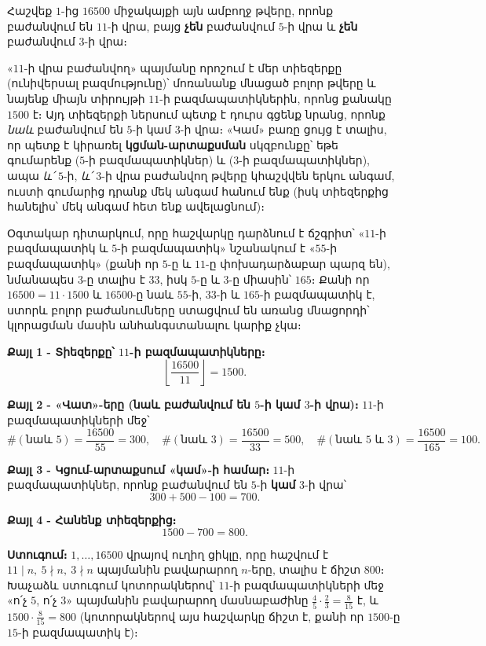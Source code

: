 \documentclass[11pt,a4paper]{article}
\begin{document}
\begin{problembox}[7]
Հաշվեք $1$-ից $16500$ միջակայքի այն ամբողջ թվերը, որոնք բաժանվում են $11$-ի վրա, բայց \textbf{չեն} բաժանվում
$5$-ի վրա և \textbf{չեն} բաժանվում $3$-ի վրա։
\end{problembox}

\begin{ideabox}
«$11$-ի վրա բաժանվող» պայմանը որոշում է մեր տիեզերքը (ունիվերսալ բազմությունը)՝ մոռանանք մնացած
բոլոր թվերը և նայենք միայն տիրույթի $11$-ի բազմապատիկներին, որոնց քանակը $1500$ է։ Այդ տիեզերքի
ներսում պետք է դուրս գցենք
նրանց, որոնք \emph{նաև} բաժանվում են $5$-ի կամ $3$-ի վրա։ «Կամ» բառը ցույց է տալիս, որ պետք է կիրառել \textbf{կցման-արտաքսման} սկզբունքը՝ եթե գումարենք ($5$-ի բազմապատիկներ) և ($3$-ի բազմապատիկներ), ապա \emph{և՛} $5$-ի,
\emph{և՛} $3$-ի վրա բաժանվող թվերը կհաշվվեն երկու անգամ, ուստի գումարից դրանք մեկ անգամ հանում ենք
(իսկ տիեզերքից հանելիս՝ մեկ անգամ հետ ենք ավելացնում)։

Օգտակար դիտարկում, որը հաշվարկը դարձնում է ճշգրիտ՝ «$11$-ի բազմապատիկ և $5$-ի բազմապատիկ» նշանակում է
«$55$-ի բազմապատիկ» (քանի որ $5$-ը և $11$-ը փոխադարձաբար պարզ են), նմանապես $3$-ը տալիս է $33$, իսկ
$5$-ը և $3$-ը միասին՝ $165$։ Քանի որ $16500=11\cdot1500$ և $16500$-ը նաև $55$-ի, $33$-ի և $165$-ի
բազմապատիկ է, ստորև բոլոր բաժանումները ստացվում են առանց մնացորդի՝ կլորացման մասին անհանգստանալու
կարիք չկա։
\end{ideabox}

\textbf{Քայլ 1 - Տիեզերքը՝ $11$-ի բազմապատիկները։}
$$\left\lfloor\frac{16500}{11}\right\rfloor=1500.$$

\textbf{Քայլ 2 - «Վատ»-երը (նաև բաժանվում են $5$-ի կամ $3$-ի վրա)։}
$11$-ի բազմապատիկների մեջ՝
$$\#(\text{նաև }5)=\frac{16500}{55}=300,\quad
  \#(\text{նաև }3)=\frac{16500}{33}=500,\quad
  \#(\text{նաև }5\text{ և }3)=\frac{16500}{165}=100.$$

\textbf{Քայլ 3 - Կցում-արտաքսում «կամ»-ի համար։}
$11$-ի բազմապատիկներ, որոնք բաժանվում են $5$-ի \textbf{կամ} $3$-ի վրա՝
$$300+500-100=700.$$

\textbf{Քայլ 4 - Հանենք տիեզերքից։}
$$1500-700=800.$$

\textbf{Ստուգում։} $1,\dots,16500$ վրայով ուղիղ ցիկլը, որը հաշվում է $11\mid n,\ 5\nmid n,\ 3\nmid n$
պայմանին բավարարող $n$-երը, տալիս է ճիշտ $800$։ Խաչաձև ստուգում կոտորակներով՝ $11$-ի
բազմապատիկների մեջ «ո՛չ $5$, ո՛չ $3$» պայմանին բավարարող մասնաբաժինը $\frac{4}{5}\cdot\frac{2}{3}=\frac{8}{15}$
է, և $1500\cdot\frac{8}{15}=800$ (կոտորակներով այս հաշվարկը ճիշտ է, քանի որ $1500$-ը $15$-ի բազմապատիկ
է)։ \checkmark
\end{document}
